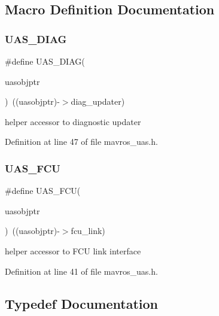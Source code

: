 \subsection{Macro Definition Documentation}
\mbox{\label{group__nodelib_ga51a676b860891367c27584276967f1d4}} 
\subsubsection{\texorpdfstring{UAS\_DIAG}{UAS\_DIAG}}
{\footnotesize\ttfamily \#define U\+A\+S\+\_\+\+D\+I\+AG(\begin{DoxyParamCaption}\item[{}]{uasobjptr }\end{DoxyParamCaption})~((uasobjptr)-\/$>$diag\+\_\+updater)}



helper accessor to diagnostic updater 



Definition at line 47 of file mavros\+\_\+uas.\+h.

\mbox{\label{group__nodelib_ga5c6dea8a8974af64cc76329a179a014d}} 
\subsubsection{\texorpdfstring{UAS\_FCU}{UAS\_FCU}}
{\footnotesize\ttfamily \#define U\+A\+S\+\_\+\+F\+CU(\begin{DoxyParamCaption}\item[{}]{uasobjptr }\end{DoxyParamCaption})~((uasobjptr)-\/$>$fcu\+\_\+link)}



helper accessor to F\+CU link interface 



Definition at line 41 of file mavros\+\_\+uas.\+h.



\subsection{Typedef Documentation}
\mbox{\label{group__nodelib_gae26d7ffaa66c0d7996857ca12600dab5}} 

